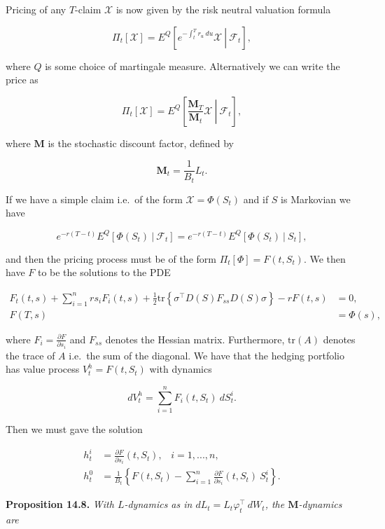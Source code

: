 \documentclass[
]{article}
\begin{document}
Pricing of any \(T\)-claim \(\mathcal{X}\) is now given by the risk
neutral valuation formula

\[
\Pi_t[\mathcal{X}] = E^Q\left[\left. e^{-\int_t^Tr_u\ du}\mathcal{X} \ \right\vert\ \mathcal{F}_t\right],\tag{14.27}
\]

where \(Q\) is some choice of martingale measure. Alternatively we can
write the price as

\[
\Pi_t[\mathcal{X}] = E^Q\left[\left. \frac{\mathbf{M}_T}{\mathbf{M}_t}\mathcal{X} \ \right\vert\ \mathcal{F}_t\right],\tag{14.29}
\]

where \(\mathbf{M}\) is the stochastic discount factor, defined by

\[
\mathbf{M}_t=\frac{1}{B_t}L_t.
\]

If we have a simple claim i.e.~of the form \(\mathcal{X}=\Phi(S_t)\) and
if \(S\) is Markovian we have

\[
e^{-r(T-t)}E^Q[\Phi(S_t)\ \vert\ \mathcal{F}_t]=e^{-r(T-t)}E^Q[\Phi(S_t)\ \vert\ S_t],
\]

and then the pricing process must be of the form
\(\Pi_t[\Phi]=F(t,S_t)\). We then have \(F\) to be the solutions to the
PDE

\begin{align*}
F_t(t,s)+\sum_{i=1}^nrs_iF_i(t,s)+\frac{1}{2}\text{tr}\left\{\sigma^\top D(S)F_{ss}D(S)\sigma\right\}-rF(t,s)&=0,\tag{14.31}\\
F(T,s)&=\Phi(s),\tag{14.31}
\end{align*}

where \(F_i=\frac{\partial F}{\partial s_i}\) and \(F_{ss}\) denotes the
Hessian matrix. Furthermore, \(\text{tr}(A)\) denotes the trace of \(A\)
i.e.~the sum of the diagonal. We have that the hedging portfolio has
value process \(V_t^h=F(t,S_t)\) with dynamics

\[
dV_t^h=\sum_{i=1}^n F_i(t,S_t)\ dS_t^i.
\]

Then we must gave the solution

\begin{align*}
h_t^i&=\frac{\partial F}{\partial s_i}(t,S_t),\hspace{10pt}i=1,...,n,\tag{14.32}\\
h_t^0&=\frac{1}{B_t}\left\{F(t,S_t)-\sum_{i=1}^n \frac{\partial F}{\partial s_i}(t,S_t)\ S_t^i\right\}.\tag{14.33}
\end{align*}

\textbf{Proposition 14.8.} \emph{With \(L\)-dynamics as in
\(dL_t=L_t\varphi^\top_t\ dW_t\), the \(\mathbf{M}\)-dynamics are}
\end{document}
